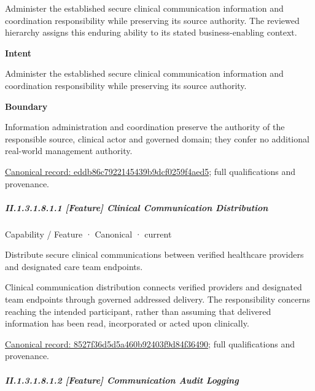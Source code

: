 Administer the established secure clinical communication information and coordination responsibility while preserving its source authority. The reviewed hierarchy assigns this enduring ability to its stated business-enabling context.



\textbf{Intent}



Administer the established secure clinical communication information and coordination responsibility while preserving its source authority.



\textbf{Boundary}



Information administration and coordination preserve the authority of the responsible source, clinical actor and governed domain; they confer no additional real-world management authority.


{\footnotesize \href{../../../../continuum/strategy/capability/eddb86c7922145439b9dcf0259f4aed5.md}{Canonical record: eddb86c7922145439b9dcf0259f4aed5}; full qualifications and provenance.}\par
\subparagraph*{II.1.3.1.8.1.1 [Feature] Clinical Communication Distribution}
\label{navigation:II.1.3.1.8.1.1}

\label{element:8527f36d5d5a460b92403f9d84f36490}
{\small Capability / Feature · Canonical · current}\par

Distribute secure clinical communications between verified healthcare providers and designated care team endpoints.



Clinical communication distribution connects verified providers and designated team endpoints through governed addressed delivery. The responsibility concerns reaching the intended participant, rather than assuming that delivered information has been read, incorporated or acted upon clinically.


{\footnotesize \href{../../../../continuum/strategy/capability/feature/8527f36d5d5a460b92403f9d84f36490.md}{Canonical record: 8527f36d5d5a460b92403f9d84f36490}; full qualifications and provenance.}\par
\subparagraph*{II.1.3.1.8.1.2 [Feature] Communication Audit Logging}
\label{navigation:II.1.3.1.8.1.2}

